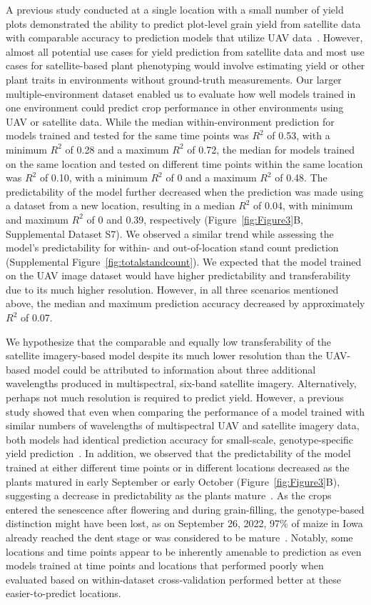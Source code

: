 \documentclass[12pt,twoside]{gsag3jnl}
\begin{document}
A previous study conducted at a single location with a small number of yield plots demonstrated the ability to predict plot-level grain yield from satellite data with comparable accuracy to prediction models that utilize UAV data~\citep{sankaran2021can}. However, almost all potential use cases for yield prediction from satellite data and most use cases for satellite-based plant phenotyping would involve estimating yield or other plant traits in environments without ground-truth measurements. Our larger multiple-environment dataset enabled us to evaluate how well models trained in one environment could predict crop performance in other environments using UAV or satellite data. While the median within-environment prediction for models trained and tested for the same time points was $R^2$ of 0.53, with a minimum $R^2$ of 0.28 and a maximum $R^2$ of 0.72, the median for models trained on the same location and tested on different time points within the same location was $R^2$ of 0.10, with a minimum $R^2$ of 0 and a maximum $R^2$ of 0.48. The predictability of the model further decreased when the prediction was made using a dataset from a new location, resulting in a median $R^2$ of 0.04, with minimum and maximum $R^2$ of 0 and 0.39, respectively (Figure~\ref{fig:Figure3}B, Supplemental Dataset S7). We observed a similar trend while assessing the model's predictability for within- and out-of-location stand count prediction (Supplemental Figure~\ref{fig:totalstandcount}). We expected that the model trained on the UAV image dataset would have higher predictability and transferability due to its much higher resolution. However, in all three scenarios mentioned above, the median and maximum prediction accuracy decreased by approximately $R^2$ of 0.07. 

We hypothesize that the comparable and equally low transferability of the satellite imagery-based model despite its much lower resolution than the UAV-based model could be attributed to information about three additional wavelengths produced in multispectral, six-band satellite imagery. Alternatively, perhaps not much resolution is required to predict yield. However, a previous study showed that even when comparing the performance of a model trained with similar numbers of wavelengths of multispectral UAV and satellite imagery data, both models had identical prediction accuracy for small-scale, genotype-specific yield prediction~\citep{sankaran2021can}. In addition, we observed that the predictability of the model trained at either different time points or in different locations decreased as the plants matured in early September or early October (Figure~\ref{fig:Figure3}B), suggesting a decrease in predictability as the plants mature~\citep{yang2019deep}. As the crops entered the senescence after flowering and during grain-filling, the genotype-based distinction might have been lost, as on September 26, 2022, 97\% of maize in Iowa already reached the dent stage or was considered to be mature~\citep{USDANASS}. Notably, some locations and time points appear to be inherently amenable to prediction as even models trained at time points and locations that performed poorly when evaluated based on within-dataset cross-validation performed better at these easier-to-predict locations. 
\end{document}
